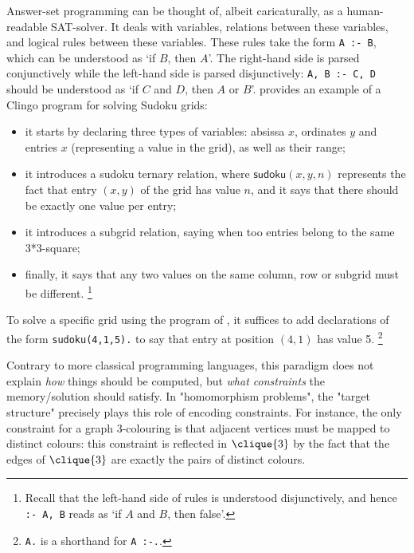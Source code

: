 Answer-set programming can be thought of, albeit caricaturally, as a human-readable
SAT-solver. It deals with variables, relations between these variables,
and logical rules between these variables. These rules take the form
\lstinline|A :- B|, which can be understood as `if $B$, then $A$'.
The right-hand side is parsed conjunctively while the left-hand side is parsed disjunctively:
\lstinline|A, B :- C, D| should be understood as `if $C$ and $D$, then $A$ or $B$'.
 provides
an example of a Clingo program for solving Sudoku grids:
\begin{itemize}
	\item it starts by declaring three types of variables: absissa $x$, ordinates $y$ and entries $x$ (representing a value in the grid), as well as their range;
	\item it introduces a \textsf{sudoku} ternary relation, where $\textsf{sudoku}(x,y,n)$
		represents the fact that entry $(x,y)$ of the grid has value $n$,
		and it says that there should be exactly one value per entry;
	\item it introduces a \textsf{subgrid} relation, saying when too entries
		belong to the same 3*3-square;
	\item finally, it says that any two values on the same column, row or subgrid
		must be different.%
		\footnote{Recall that the left-hand side of rules is understood disjunctively,
		and hence \lstinline|:- A, B| reads as `if $A$ and $B$, then false'.}
\end{itemize}
To solve a specific grid using the program of ,
it suffices to add declarations of the form \lstinline|sudoku(4,1,5).| to say that entry
at position $(4,1)$ has value 5.%
\footnote{\lstinline|A.| is a shorthand for \lstinline|A :-.|.}

Contrary to more classical programming languages, this paradigm does not explain \emph{how} things
should be computed, but \emph{what constraints} the memory/solution should satisfy.
In "homomorphism problems", the "target structure" precisely plays this role of
encoding constraints. For instance, the only constraint for a graph $3$-colouring is that
adjacent vertices must be mapped to distinct colours: this constraint is
reflected in $\clique{3}$ by the fact that the edges of $\clique{3}$ are exactly the pairs
of distinct colours.

